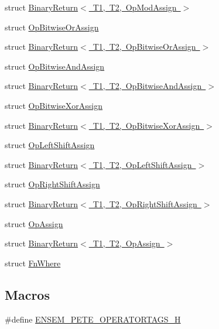 \begin{DoxyCompactItemize}
\item 
struct \mbox{\hyperlink{structBinaryReturn_3_01T1_00_01T2_00_01OpModAssign_01_4}{Binary\+Return$<$ T1, T2, Op\+Mod\+Assign $>$}}
\item 
struct \mbox{\hyperlink{structOpBitwiseOrAssign}{Op\+Bitwise\+Or\+Assign}}
\item 
struct \mbox{\hyperlink{structBinaryReturn_3_01T1_00_01T2_00_01OpBitwiseOrAssign_01_4}{Binary\+Return$<$ T1, T2, Op\+Bitwise\+Or\+Assign $>$}}
\item 
struct \mbox{\hyperlink{structOpBitwiseAndAssign}{Op\+Bitwise\+And\+Assign}}
\item 
struct \mbox{\hyperlink{structBinaryReturn_3_01T1_00_01T2_00_01OpBitwiseAndAssign_01_4}{Binary\+Return$<$ T1, T2, Op\+Bitwise\+And\+Assign $>$}}
\item 
struct \mbox{\hyperlink{structOpBitwiseXorAssign}{Op\+Bitwise\+Xor\+Assign}}
\item 
struct \mbox{\hyperlink{structBinaryReturn_3_01T1_00_01T2_00_01OpBitwiseXorAssign_01_4}{Binary\+Return$<$ T1, T2, Op\+Bitwise\+Xor\+Assign $>$}}
\item 
struct \mbox{\hyperlink{structOpLeftShiftAssign}{Op\+Left\+Shift\+Assign}}
\item 
struct \mbox{\hyperlink{structBinaryReturn_3_01T1_00_01T2_00_01OpLeftShiftAssign_01_4}{Binary\+Return$<$ T1, T2, Op\+Left\+Shift\+Assign $>$}}
\item 
struct \mbox{\hyperlink{structOpRightShiftAssign}{Op\+Right\+Shift\+Assign}}
\item 
struct \mbox{\hyperlink{structBinaryReturn_3_01T1_00_01T2_00_01OpRightShiftAssign_01_4}{Binary\+Return$<$ T1, T2, Op\+Right\+Shift\+Assign $>$}}
\item 
struct \mbox{\hyperlink{structOpAssign}{Op\+Assign}}
\item 
struct \mbox{\hyperlink{structBinaryReturn_3_01T1_00_01T2_00_01OpAssign_01_4}{Binary\+Return$<$ T1, T2, Op\+Assign $>$}}
\item 
struct \mbox{\hyperlink{structFnWhere}{Fn\+Where}}
\end{DoxyCompactItemize}
\subsection*{Macros}
\begin{DoxyCompactItemize}
\item 
\#define \mbox{\hyperlink{adat-devel_2lib_2ensem_2ensem_8h_ab16b62575f3d8b4e9640c59b0386ff08}{E\+N\+S\+E\+M\+\_\+\+P\+E\+T\+E\+\_\+\+O\+P\+E\+R\+A\+T\+O\+R\+T\+A\+G\+S\+\_\+H}}
\end{DoxyCompactItemize}


